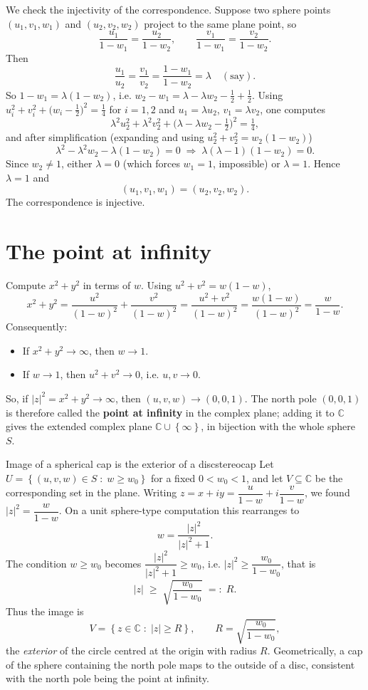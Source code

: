 \documentclass[11pt,openany]{report}
\newcommand{\C}{\mathbb{C}}
\newcommand{\abs}[1]{\left\lvert #1 \right\rvert}
\newcommand{\set}[1]{\left\{ #1 \right\}}
\begin{document}
We check the injectivity of the correspondence. Suppose two sphere points
$(u_1,v_1,w_1)$ and $(u_2,v_2,w_2)$ project to the same plane point, so
\[
  \frac{u_1}{1-w_1} = \frac{u_2}{1-w_2}, \qquad \frac{v_1}{1-w_1} = \frac{v_2}{1-w_2}.
\]
Then
\[
  \frac{u_1}{u_2} = \frac{v_1}{v_2} = \frac{1-w_1}{1-w_2} = \lambda \quad(\text{say}).
\]
So $1-w_1=\lambda(1-w_2)$, i.e. $w_2-w_1=\lambda-\lambda w_2 - \tfrac12+\tfrac12$. Using
$u_i^2+v_i^2+\big(w_i-\tfrac12\big)^2=\tfrac14$ for $i=1,2$ and $u_1=\lambda u_2$,
$v_1=\lambda v_2$, one computes
\[
  \lambda^2 u_2^2 + \lambda^2 v_2^2 + \Big(\lambda-\lambda w_2 - \tfrac12\Big)^2 = \tfrac14,
\]
and after simplification (expanding and using $u_2^2+v_2^2=w_2(1-w_2)$)
\[
  \lambda^2 - \lambda^2 w_2 - \lambda(1-w_2) = 0
  \;\Longrightarrow\; \lambda(\lambda-1)(1-w_2) = 0.
\]
Since $w_2\neq1$, either $\lambda=0$ (which forces $w_1=1$, impossible) or $\lambda=1$.
Hence $\lambda=1$ and
\[
  \boxed{\;(u_1,v_1,w_1) = (u_2,v_2,w_2).\;}
\]
The correspondence is injective.

\section{The point at infinity}

Compute $x^2+y^2$ in terms of $w$. Using $u^2+v^2=w(1-w)$,
\[
  x^2+y^2 = \frac{u^2}{(1-w)^2} + \frac{v^2}{(1-w)^2}
  = \frac{u^2+v^2}{(1-w)^2} = \frac{w(1-w)}{(1-w)^2} = \frac{w}{1-w}.
\]
Consequently:
\begin{itemize}[leftmargin=1.4em]
  \item If $x^2+y^2\to\infty$, then $w\to1$.
  \item If $w\to1$, then $u^2+v^2\to0$, i.e. $u,v\to0$.
\end{itemize}
So, if $\abs{z}^2 = x^2+y^2\to\infty$, then $(u,v,w)\to(0,0,1)$. The north pole
$(0,0,1)$ is therefore called the \textbf{point at infinity} in the complex plane; adding
it to $\C$ gives the extended complex plane $\C\cup\set{\infty}$, in bijection with the
whole sphere $S$.

\begin{example}{Image of a spherical cap is the exterior of a disc}{stereocap}
Let $U = \set{ (u,v,w)\in S \;:\; w\ge w_0 }$ for a fixed $0<w_0<1$, and let $V\subseteq\C$
be the corresponding set in the plane. Writing $z=x+iy=\dfrac{u}{1-w}+i\dfrac{v}{1-w}$,
we found $\abs{z}^2 = \dfrac{w}{1-w}$. On a unit sphere-type computation this rearranges to
\[
  w = \frac{\abs{z}^2}{\abs{z}^2+1}.
\]
The condition $w\ge w_0$ becomes $\dfrac{\abs{z}^2}{\abs{z}^2+1}\ge w_0$, i.e.
$\abs{z}^2 \ge \dfrac{w_0}{1-w_0}$, that is
\[
  \abs{z} \;\ge\; \sqrt{\frac{w_0}{1-w_0}} \;=:\; R.
\]
Thus the image is
\[
  V = \set{ z\in\C \;:\; \abs{z} \ge R }, \qquad R = \sqrt{\frac{w_0}{1-w_0}},
\]
the \emph{exterior} of the circle centred at the origin with radius $R$. Geometrically, a
cap of the sphere containing the north pole maps to the outside of a disc, consistent with
the north pole being the point at infinity.
\end{example}
\end{document}
